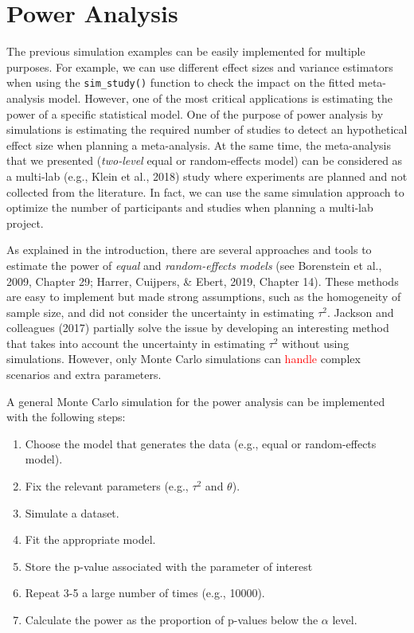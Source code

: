 \documentclass[
  man,floatsintext]{apa6}
\providecommand{\tightlist}{%
  \setlength{\itemsep}{0pt}\setlength{\parskip}{0pt}}
\begin{document}
\normalsize

\hypertarget{power-analysis}{%
\section{Power Analysis}\label{power-analysis}}

The previous simulation examples can be easily implemented for multiple purposes. For example, we can use different effect sizes and variance estimators when using the \texttt{sim\_study()} function to check the impact on the fitted meta-analysis model. However, one of the most critical applications is estimating the power of a specific statistical model. \color{red} One of the purpose of power analysis by simulations is estimating the required number of studies to detect an hypothetical effect size when planning a meta-analysis. At the same time, the meta-analysis that we presented (\emph{two-level} equal or random-effects model) can be considered as a multi-lab (e.g., Klein et al., 2018) study where experiments are planned and not collected from the literature. In fact, we can use the same simulation approach to optimize the number of participants and studies when planning a multi-lab project. \color{black}

As explained in the introduction, there are several approaches and tools to estimate the power of \emph{equal} and \emph{random-effects models} (see Borenstein et al., 2009, Chapter 29; Harrer, Cuijpers, \& Ebert, 2019, Chapter 14). These methods are easy to implement but made strong assumptions, such as the homogeneity of sample size, and did not consider the uncertainty in estimating \(\tau^{2}\). Jackson and colleagues (2017) partially solve the issue by developing an interesting method that takes into account the uncertainty in estimating \(\tau^{2}\) without using simulations. However, only Monte Carlo simulations can \textcolor{red}{handle} complex scenarios and extra parameters.

A general Monte Carlo simulation for the power analysis can be implemented with the following steps:

\begin{enumerate}
\def\labelenumi{\arabic{enumi}.}
\tightlist
\item
  Choose the model that generates the data (e.g., equal or random-effects model).
\item
  Fix the relevant parameters (e.g., \(\tau^{2}\) and \(\theta\)).
\item
  Simulate a dataset.
\item
  Fit the appropriate model.
\item
  Store the p-value associated with the parameter of interest
\item
  Repeat 3-5 a large number of times (e.g., 10000).
\item
  Calculate the power as the proportion of p-values below the \(\alpha\) level.
\end{enumerate}
\end{document}
